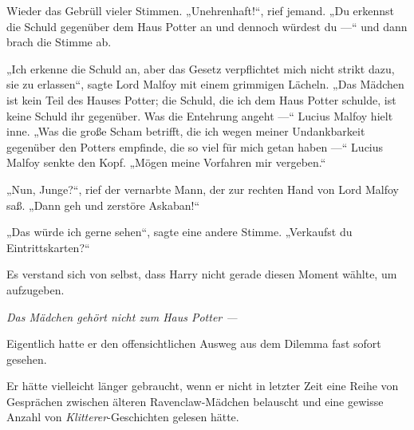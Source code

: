 Wieder das Gebrüll vieler Stimmen.
„Unehrenhaft!“, rief jemand.
„Du erkennst die Schuld gegenüber dem Haus Potter an und dennoch würdest du —“ und dann brach die Stimme ab.

„Ich erkenne die Schuld an, aber das Gesetz verpflichtet mich nicht strikt dazu, sie zu erlassen“, sagte Lord Malfoy mit einem grimmigen Lächeln.
„Das Mädchen ist kein Teil des Hauses Potter; die Schuld, die ich dem Haus Potter schulde, ist keine Schuld ihr gegenüber. Was die Entehrung angeht —“ Lucius Malfoy hielt inne.
„Was die große Scham betrifft, die ich wegen meiner Undankbarkeit gegenüber den Potters empfinde, die so viel für mich getan haben —“
Lucius Malfoy senkte den Kopf.
„Mögen meine Vorfahren mir vergeben.“

„Nun, Junge?“, rief der vernarbte Mann, der zur rechten Hand von Lord Malfoy saß.
„Dann geh und zerstöre Askaban!“

„Das würde ich gerne sehen“, sagte eine andere Stimme.
„Verkaufst du Eintrittskarten?“

Es verstand sich von selbst, dass Harry nicht gerade diesen Moment wählte, um aufzugeben.

\emph{Das Mädchen gehört nicht zum Haus Potter —}

Eigentlich hatte er den offensichtlichen Ausweg aus dem Dilemma fast sofort gesehen.

Er hätte vielleicht länger gebraucht, wenn er nicht in letzter Zeit eine Reihe von Gesprächen zwischen älteren Ravenclaw-Mädchen belauscht und eine gewisse Anzahl von \emph{Klitterer}-Geschichten gelesen hätte.

